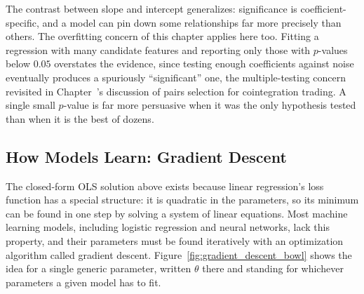 \documentclass[../ai_in_finance]{subfiles}
\begin{document}
The contrast between slope and intercept generalizes: significance is coefficient-specific, and a model can pin down some relationships far more precisely than others. The overfitting concern of this chapter applies here too. Fitting a regression with many candidate features and reporting only those with $p$-values below $0.05$ overstates the evidence, since testing enough coefficients against noise eventually produces a spuriously ``significant'' one, the multiple-testing concern revisited in Chapter~'s discussion of pairs selection for cointegration trading. A single small $p$-value is far more persuasive when it was the only hypothesis tested than when it is the best of dozens.

\subsection{How Models Learn: Gradient Descent}
\label{sec:gradient-descent}

The closed-form OLS solution above exists because linear regression's loss function has a special structure: it is quadratic in the parameters, so its minimum can be found in one step by solving a system of linear equations. Most machine learning models, including logistic regression and neural networks, lack this property, and their parameters must be found iteratively with an optimization algorithm called gradient descent. Figure~\ref{fig:gradient_descent_bowl} shows the idea for a single generic parameter, written $\theta$ there and standing for whichever parameters a given model has to fit.
\end{document}
